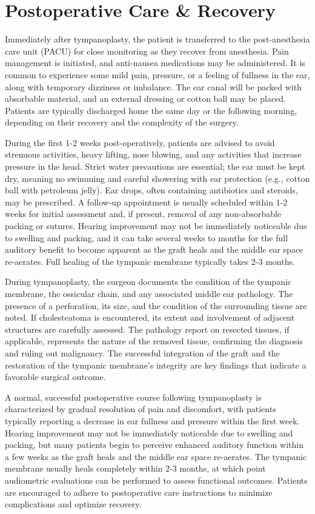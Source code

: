 \section*{Postoperative Care \& Recovery}
Immediately after tympanoplasty, the patient is transferred to the post-anesthesia care unit (PACU) for close monitoring as they recover from anesthesia. Pain management is initiated, and anti-nausea medications may be administered. It is common to experience some mild pain, pressure, or a feeling of fullness in the ear, along with temporary dizziness or imbalance. The ear canal will be packed with absorbable material, and an external dressing or cotton ball may be placed. Patients are typically discharged home the same day or the following morning, depending on their recovery and the complexity of the surgery.

During the first 1-2 weeks post-operatively, patients are advised to avoid strenuous activities, heavy lifting, nose blowing, and any activities that increase pressure in the head. Strict water precautions are essential; the ear must be kept dry, meaning no swimming and careful showering with ear protection (e.g., cotton ball with petroleum jelly). Ear drops, often containing antibiotics and steroids, may be prescribed. A follow-up appointment is usually scheduled within 1-2 weeks for initial assessment and, if present, removal of any non-absorbable packing or sutures. Hearing improvement may not be immediately noticeable due to swelling and packing, and it can take several weeks to months for the full auditory benefit to become apparent as the graft heals and the middle ear space re-aerates. Full healing of the tympanic membrane typically takes 2-3 months.

During tympanoplasty, the surgeon documents the condition of the tympanic membrane, the ossicular chain, and any associated middle ear pathology. The presence of a perforation, its size, and the condition of the surrounding tissue are noted. If cholesteatoma is encountered, its extent and involvement of adjacent structures are carefully assessed. The pathology report on resected tissues, if applicable, represents the nature of the removed tissue, confirming the diagnosis and ruling out malignancy. The successful integration of the graft and the restoration of the tympanic membrane's integrity are key findings that indicate a favorable surgical outcome.

A normal, successful postoperative course following tympanoplasty is characterized by gradual resolution of pain and discomfort, with patients typically reporting a decrease in ear fullness and pressure within the first week. Hearing improvement may not be immediately noticeable due to swelling and packing, but many patients begin to perceive enhanced auditory function within a few weeks as the graft heals and the middle ear space re-aerates. The tympanic membrane usually heals completely within 2-3 months, at which point audiometric evaluations can be performed to assess functional outcomes. Patients are encouraged to adhere to postoperative care instructions to minimize complications and optimize recovery.

